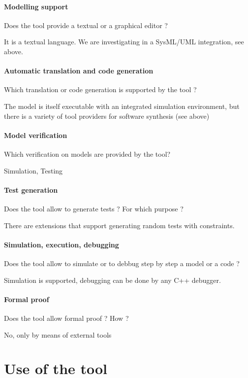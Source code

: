 \begin{assesor1}
\paragraph{Modelling support}
Does the tool provide a textual or a graphical editor ?

It is a textual language. We are investigating in a SysML/UML integration, see above.

\paragraph{Automatic translation and code generation}
Which translation or code generation is supported by the tool ?

The model is itself executable with an integrated simulation environment, but there is a variety of tool providers for software synthesis (see above)

\paragraph{Model verification}
Which verification on models are provided by the tool?

Simulation, Testing

\paragraph{Test generation}
Does the tool allow to generate tests ? For which purpose ?

There are extensions that support generating random tests with constraints.

\paragraph{Simulation, execution, debugging}
Does the tool allow to simulate or to debbug step by step a model or a code ?

Simulation is supported, debugging can be done by any C++ debugger.

\paragraph{Formal proof}
Does the tool allow formal proof ? How ?

No, only by means of external tools


\section{Use of the tool}



\end{assesor1}
